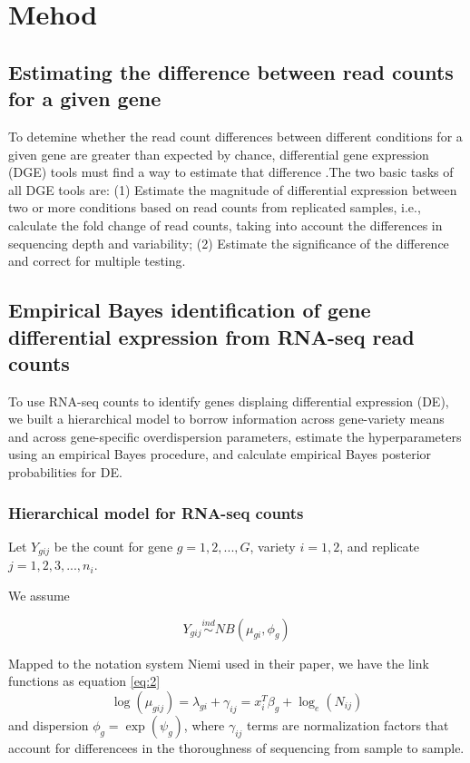 \chapter{Mehod}

\section{Estimating the difference between read counts for a given gene}

To detemine whether the read count differences between different conditions for a given gene are greater than expected by chance, differential gene expression (DGE) tools must find a way to estimate that difference \citep{dundar2015introduction}.The two basic tasks of all DGE tools are: (1) Estimate the magnitude of differential expression between two or more conditions based on read counts from replicated samples, i.e., calculate the fold change of read counts, taking into account the differences in sequencing depth and variability; (2) Estimate the significance of the difference and correct for multiple testing. 

\section{Empirical Bayes identification of gene differential expression from RNA-seq read counts}


To use RNA-seq counts to identify genes displaing differential expression (DE), we built a hierarchical model to borrow information across gene-variety means and across gene-specific overdispersion parameters, estimate the hyperparameters using an empirical Bayes procedure, and calculate empirical Bayes posterior probabilities for DE. 

\subsection{Hierarchical model for RNA-seq counts}

Let $Y_{gij}$ be the count for gene $g=1,2,..., G$, variety $i=1,2$, and replicate $j=1,2,3,...,n_i$.

We assume

\begin{equation}
\label{eq:1}
Y_{gij} \stackrel{ind}{\sim} NB(\mu_{gi}, \phi_g)
\end{equation}

Mapped to the notation system Niemi used in their paper\citep{niemi2015empirical}, we have the link functions as equation \ref{eq:2}
\begin{equation}
\label{eq:2}
\log(\mu_{gij}) = \lambda_{gi} + \gamma_{ij} = x_i^T \beta_g + \log_e (N_{ij})
\end{equation}
and dispersion $\phi_g = \exp{(\psi_g)}$, where $\gamma_{ij}$ terms are normalization factors that account for differencees in the thoroughness of sequencing from sample to sample. 

